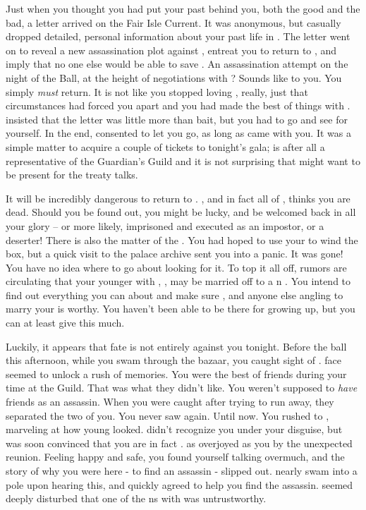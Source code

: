 \documentclass[char]{NeptuneBall}
\begin{document}
Just when you thought you had put your past behind you, both the good and the bad, a letter arrived on the Fair Isle Current. It was anonymous, but casually dropped detailed, personal information about your past life in \pAtlantis{}. The letter went on to reveal a new assassination plot against \cKing{}, entreat you to return to \pAtlantis{}, and imply that no one else would be able to save \cKing{}. An assassination attempt on the night of the \cExExKing{} Ball, at the height of negotiations with \pPacifica{}? Sounds like \pAssassin{} to you. You simply \emph{must} return. It is not like you stopped loving \cKing{}, really, just that circumstances had forced you apart and you had made the best of things with \cGeneral{}. \cGeneral{} insisted that the letter was little more than bait, but you had to go and see for yourself.  In the end, \cGeneral{} consented to let you go, as long as \cGeneral{\they} came with you. It was a simple matter to acquire a couple of tickets to tonight's gala; \cGeneral{} is after all a representative of the Guardian's Guild and it is not surprising that \cGeneral{\they} might want to be present for the treaty talks.

It will be incredibly dangerous to return to \pAtlantis{}. \cKing{}, and in fact all of \pAtlantis{}, thinks you are dead. Should you be found out, you might be lucky, and be welcomed back in all your glory -- or more likely, imprisoned and executed as an impostor, or a deserter! There is also the matter of the \iMusicBox{\MYname}. You had hoped to use your \iMusicBoxKey{} to wind the box, but a quick visit to the palace archive sent you into a panic. It was gone! You have no idea where to go about looking for it. To top it all off, rumors are circulating that your younger \cPrincess{\offspring} with \cKing{}, \cPrincess{}, may be married off to a \pPacifica{}n \cPrince{\prince}. You intend to find out everything you can about \cPrince{\them} and make sure \cPrince{\they}, and anyone else angling to marry your \cPrincess{\offspring} is worthy. You haven't been able to be there for \cPrincess{} growing up, but you can at least give \cPrincess{\them} this much.

Luckily, it appears that fate is not entirely against you tonight. Before the ball this afternoon, while you swam through the bazaar, you caught sight of \cDiplomat{}. \cDiplomat{\Their} face seemed to unlock a rush of memories. You were the best of friends during your time at the Guild.  That was what they didn't like. You weren't supposed to \emph{have} friends as an assassin.  When you were caught after trying to run away, they separated the two of you. You never saw \cDiplomat{\them} again. Until now. You rushed to \cDiplomat{\them}, marveling at how young \cDiplomat{\they} looked. \cDiplomat{} didn't recognize you under your disguise, but was soon convinced that you are in fact \cQueen{}. \cDiplomat{\They} \cDiplomat{\were} as overjoyed as you by the unexpected reunion. Feeling happy and safe, you found yourself talking overmuch, and the story of why you were here - to find an assassin - slipped out. \cDiplomat{} nearly swam into a pole upon hearing this, and quickly agreed to help you find the assassin. \cDiplomat{\They} seemed deeply disturbed that one of the \pPacifica{}ns with \cDiplomat{\them} was untrustworthy.
\end{document}
